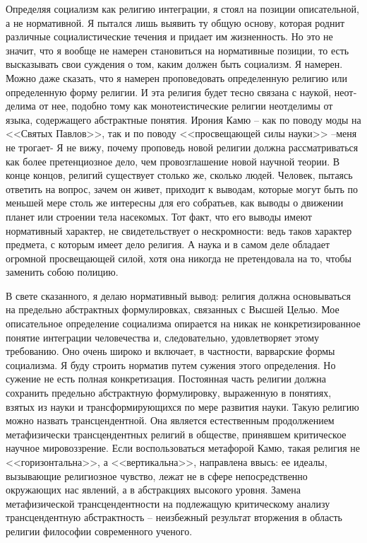 \documentclass{book}
\begin{document}
Определяя социализм как религию интеграции, я стоял на позиции описательной, а не нормативной. Я пытался лишь выя­вить ту общую основу, которая роднит различные социалисти­ческие течения и придает им жизненность. Но это не значит, что я вообще не намерен становиться на нормативные позиции, то есть высказывать свои суждения о том, каким должен быть социализм. Я намерен. Можно даже сказать, что я намерен проповедовать определенную религию или определенную фор­му религии. И эта религия будет тесно связана с наукой, неот­делима от нее, подобно тому как монотеистические религии неотделимы от языка, содержащего абстрактные понятия. Ирония Камю -- как по поводу моды на <<Святых Павлов>>, так и по поводу <<просвещающей силы науки>> --меня не тро­гает- Я не вижу, почему проповедь новой религии должна рас­сматриваться как более претенциозное дело, чем провозглаше­ние новой научной теории. В конце концов, религий существу­ет столько же, сколько людей. Человек, пытаясь ответить на вопрос, зачем он живет, приходит к 
выводам, которые могут быть по меньшей мере столь же интересны для его собратьев, как выводы о движении планет или строении тела насекомых. Тот факт, что его выводы имеют нормативный характер, не сви­детельствует о нескромности: ведь таков характер предмета, с которым имеет дело религия. А наука и в самом деле обла­дает огромной просвещающей силой, хотя она никогда не пре­тендовала на то, чтобы заменить собою полицию.

В свете сказанного, я делаю нормативный вывод: религия должна основываться на предельно абстрактных формулиров­ках, связанных с Высшей Целью. Мое описательное определе­ние социализма опирается на никак не конкретизированное понятие интеграции человечества и, следовательно, удовлетво­ряет этому требованию. Оно очень широко и включает, в частности, варварские формы социализма. Я буду строить норматив путем сужения этого определения. Но сужение не есть полная конкретизация. Постоянная часть религии должна сохранить предельно абстрактную формулировку, выраженную в понятиях, взятых из науки и трансформирующихся по мере развития науки. Такую религию можно назвать трансцендентной. Она является естественным продолжением метафизически трансцендентных религий в обществе, принявшем критическое научное мировоззрение. Если воспользоваться метафорой Камю, такая религия не <<горизонтальна>>, а <<вертикальна>>, направле­на ввысь: ее идеалы, вызывающие религиозное чувство, лежат не в сфере непосредственно окружающих нас 
явлений, а в абстракциях высокого уровня. Замена метафизической транс­цендентности на подлежащую критическому анализу трансцендентную абстрактность -- неизбежный результат вторжения в область религии философии современного ученого.
\end{document}
